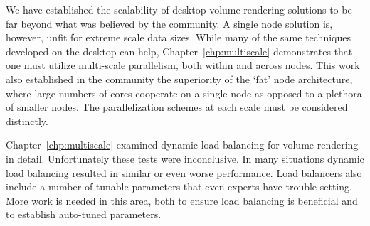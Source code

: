 
We have established the scalability of desktop volume rendering
solutions to be far beyond what was believed by the community.  A
single node solution is, however, unfit for extreme scale data sizes.
While many of the same techniques developed on the desktop can help,
Chapter~\ref{chp:multiscale} demonstrates that one must utilize
multi-scale parallelism, both within and across nodes.  This work
also established in the community the superiority of the `fat' node
architecture, where large numbers of cores cooperate on a single node
as opposed to a plethora of smaller nodes.  The parallelization schemes
at each scale must be considered distinctly.


Chapter~\ref{chp:multiscale} examined dynamic load balancing for volume
rendering in detail.  Unfortunately these tests were inconclusive.  In
many situations dynamic load balancing resulted in similar or even
worse performance.  Load balancers also include a number of tunable
parameters that even experts have trouble setting.  More work is needed
in this area, both to ensure load balancing is beneficial and to
establish auto-tuned parameters.

